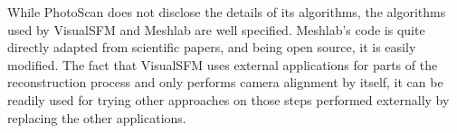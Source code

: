 While PhotoScan does not disclose the details of its algorithms, the algorithms used by VisualSFM and Meshlab are well specified.
Meshlab's code is quite directly adapted from scientific papers, and being open source, it is easily modified.
The fact that VisualSFM uses external applications for parts of the reconstruction process and only performs camera alignment by itself, it can be readily used for trying other approaches on those steps performed externally by replacing the other applications.
